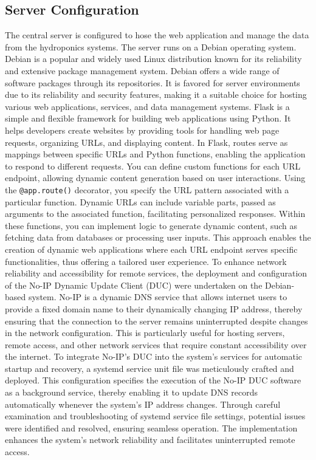 \documentclass[12pt]{article}
\begin{document}
\subsection{Server Configuration}
\noindent The central server is configured to hose the web application and manage the data 
from the hydroponics systems. The server runs on a Debian operating system. Debian is a popular and widely used Linux distribution known for its reliability and extensive package management system. Debian offers a wide range of software packages through its repositories. It is favored for server environments due to its reliability and security features, making it a suitable choice for hosting various web applications, services, and data management systems.
\newline
\newline
\noindent Flask is a simple and flexible framework for building web applications using Python. It helps developers create websites by providing tools for handling web page requests, organizing URLs, and displaying content. In Flask, routes serve as mappings between specific URLs and Python functions, enabling the application to respond to different requests. You can define custom functions for each URL endpoint, allowing dynamic content generation based on user interactions. Using the \verb|@app.route()| decorator, you specify the URL pattern associated with a particular function. Dynamic URLs can include variable parts, passed as arguments to the associated function, facilitating personalized responses. Within these functions, you can implement logic to generate dynamic content, such as fetching data from databases or processing user inputs. This approach enables the creation of dynamic web applications where each URL endpoint serves specific functionalities, thus offering a tailored user experience.
\newline
\newline
\noindent To enhance network reliability and accessibility for remote services, the deployment and configuration of the No-IP Dynamic Update Client (DUC) were undertaken on the Debian-based system. No-IP is a dynamic DNS service that allows internet users to provide a fixed domain name to their dynamically changing IP address, thereby ensuring that the connection to the server remains uninterrupted despite changes in the network configuration. This is particularly useful for hosting servers, remote access, and other network services that require constant accessibility over the internet. To integrate No-IP's DUC into the system's services for automatic startup and recovery, a systemd service unit file was meticulously crafted and deployed. This configuration specifies the execution of the No-IP DUC software as a background service, thereby enabling it to update DNS records automatically whenever the system's IP address changes. Through careful examination and troubleshooting of systemd service file settings, potential issues were identified and resolved, ensuring seamless operation. The implementation enhances the system's network reliability and facilitates uninterrupted remote access.
\end{document}
